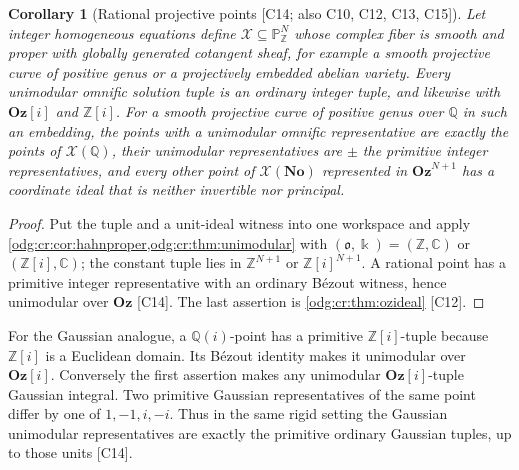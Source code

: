 \documentclass[11pt,oneside]{article}
\numberwithin{equation}{section}
\newtheorem{corollary}[corollary]{Corollary}
\theoremstyle{definition}
\theoremstyle{remark}
\newcommand{\No}{\mathbf{No}}
\newcommand{\Oz}{\mathbf{Oz}}
\newcommand{\Z}{\mathbb Z}
\newcommand{\Q}{\mathbb Q}
\newcommand{\C}{\mathbb C}
\newcommand{\src}[1]{\textup{\textsf{\small[#1]}}}
\newcommand{\Og}{\Oz[i]}
\begin{document}
\begin{corollary}[Rational projective points \src{C14; also C10, C12, C13, C15}]\label{odg:cr:cor:projectiveQ}
Let integer homogeneous equations define $\mathcal X\subseteq\mathbb P^N_\Z$ whose
complex fiber is smooth and proper with globally generated cotangent sheaf, for
example a smooth projective curve of positive genus or a projectively embedded
abelian variety. Every unimodular omnific solution tuple is an ordinary integer
tuple, and likewise with $\Og$ and $\Z[i]$. For a smooth projective curve of
positive genus over $\Q$ in such an embedding, the points with a unimodular omnific
representative are exactly the points of $\mathcal X(\Q)$, their unimodular
representatives are $\pm$ the primitive integer representatives, and every other
point of $\mathcal X(\No)$ represented in $\Oz^{N+1}$ has a coordinate ideal that is
neither invertible nor principal.
\end{corollary}
\begin{proof}
Put the tuple and a unit-ideal witness into one workspace and apply
\cref{odg:cr:cor:hahnproper,odg:cr:thm:unimodular} with $(\mathfrak o,\Bbbk)=(\Z,\C)$
or $(\Z[i],\C)$; the constant tuple lies in $\Z^{N+1}$ or $\Z[i]^{N+1}$. A rational
point has a primitive integer representative with an ordinary B\'ezout witness,
hence unimodular over $\Oz$ \src{C14}. The last assertion is
\cref{odg:cr:thm:ozideal} \src{C12}.
\end{proof}

For the Gaussian analogue, a $\Q(i)$-point has a primitive $\Z[i]$-tuple
because $\Z[i]$ is a Euclidean domain. Its B\'ezout identity makes it
unimodular over $\Og$. Conversely the first assertion makes any unimodular
$\Og$-tuple Gaussian integral. Two primitive Gaussian representatives of
the same point differ by one of $1,-1,i,-i$. Thus in the same rigid setting
the Gaussian unimodular representatives are exactly the primitive ordinary
Gaussian tuples, up to those units \src{C14}.
\end{document}
